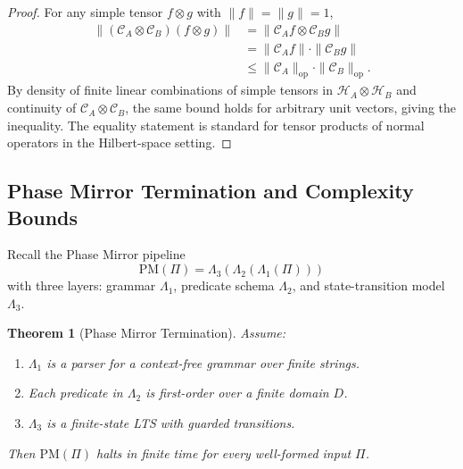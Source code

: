 \documentclass[12pt,letterpaper]{article}
\theoremstyle{definition}
\theoremstyle{plain}
\newtheorem{theorem}{Theorem}[section]
\theoremstyle{remark}
\begin{document}
\begin{proof}
For any simple tensor \(f \otimes g\) with \(\|f\| = \|g\| = 1\),
\begin{align*}
\|(\mathcal{C}_A \otimes \mathcal{C}_B)(f \otimes g)\|
  &= \|\mathcal{C}_A f \otimes \mathcal{C}_B g\| \\
  &= \|\mathcal{C}_A f\| \cdot \|\mathcal{C}_B g\| \\
  &\le \|\mathcal{C}_A\|_{\mathrm{op}} \cdot \|\mathcal{C}_B\|_{\mathrm{op}}.
\end{align*}
By density of finite linear combinations of simple tensors in \(\mathcal{H}_A \otimes \mathcal{H}_B\) and continuity of \(\mathcal{C}_A \otimes \mathcal{C}_B\), the same bound holds for arbitrary unit vectors, giving the inequality. The equality statement is standard for tensor products of normal operators in the Hilbert-space setting.
\end{proof}

\subsection{Phase Mirror Termination and Complexity Bounds}
\label{subsec:pm-termination}

Recall the Phase Mirror pipeline
\[
\mathrm{PM}(\Pi) = \Lambda_3(\Lambda_2(\Lambda_1(\Pi)))
\]
with three layers: grammar \(\Lambda_1\), predicate schema \(\Lambda_2\), and state-transition model \(\Lambda_3\).

\begin{theorem}[Phase Mirror Termination]
Assume:
\begin{enumerate}
  \item \(\Lambda_1\) is a parser for a context-free grammar over finite strings.
  \item Each predicate in \(\Lambda_2\) is first-order over a finite domain \(D\).
  \item \(\Lambda_3\) is a finite-state LTS with guarded transitions.
\end{enumerate}
Then \(\mathrm{PM}(\Pi)\) halts in finite time for every well-formed input \(\Pi\).
\end{theorem}
\end{document}
